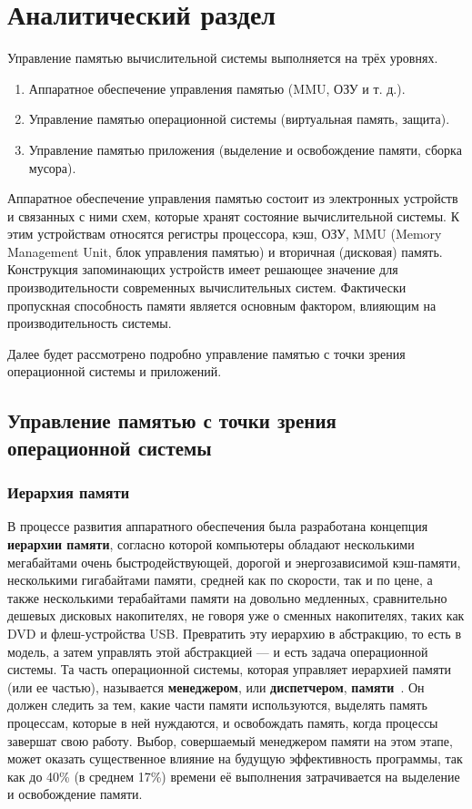 \chapter{Аналитический раздел}

Управление памятью вычислительной системы выполняется на трёх уровнях. 

\begin{enumerate}[label*=\arabic*.]
	\item Аппаратное обеспечение управления памятью (MMU, ОЗУ и т. д.).
	\item Управление памятью операционной системы (виртуальная память, защита).
	\item Управление памятью приложения (выделение и освобождение памяти, сборка мусора).
\end{enumerate}

Аппаратное обеспечение управления памятью состоит из электронных устройств и связанных с ними схем, которые хранят состояние вычислительной системы. К этим устройствам относятся регистры процессора, кэш, ОЗУ, MMU (Memory Management Unit, блок управления памятью) и вторичная (дисковая) память. Конструкция запоминающих устройств имеет решающее значение для производительности современных вычислительных систем. Фактически пропускная способность памяти является основным фактором, влияющим на производительность системы.~\cite{glossary}

Далее будет рассмотрено подробно управление памятью с точки зрения операционной системы и приложений.

\section{Управление памятью с точки зрения операционной системы}

\subsection{Иерархия памяти}

В процессе развития аппаратного обеспечения была разработана концепция \textbf{иерархии памяти}, согласно которой компьютеры обладают несколькими мегабайтами очень быстродействующей, дорогой и энергозависимой кэш-памяти, несколькими гигабайтами памяти, средней как по скорости, так и по цене, а также несколькими терабайтами памяти на довольно медленных, сравнительно дешевых дисковых накопителях, не говоря уже о сменных накопителях, таких как DVD и флеш-устройства USB. Превратить эту иерархию в абстракцию, то есть в модель, а затем управлять этой абстракцией --- и есть задача операционной системы. Та часть операционной системы, которая управляет иерархией памяти (или ее частью), называется \textbf{менеджером}, или \textbf{диспетчером}, \textbf{памяти}~\cite{tannenbaum}. Он должен следить за тем, какие части памяти используются, выделять память процессам, которые в ней нуждаются, и освобождать память, когда процессы завершат свою работу. Выбор, совершаемый менеджером памяти на этом этапе, может оказать существенное влияние на будущую эффективность программы, так как до 40\% (в среднем 17\%) времени её выполнения затрачивается на выделение и освобождение памяти.~\cite{cornell}

